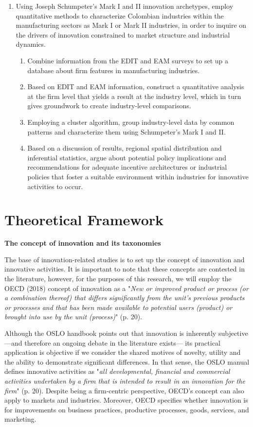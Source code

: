 \documentclass[12pt,a4paper]{article}
\begin{document}
\begin{enumerate}
	\item \large Using Joseph Schumpeter’s Mark I and II innovation archetypes, employ quantitative methods to characterize Colombian industries within the manufacturing sectors as Mark I or Mark II industries, in order to inquire on the drivers of innovation constrained to market structure and industrial dynamics.
\begin{enumerate}
	\item \normalsize Combine information from the EDIT and EAM surveys to set up a database about firm features in manufacturing industries.
	\item Based on EDIT and EAM information, construct a quantitative analysis at the firm level that yields a result at the industry level, which in turn gives groundwork to create industry-level comparisons.
	\item Employing a cluster algorithm, group industry-level data by common patterns and characterize them using Schumpeter's Mark I and II.
	\item Based on a discussion of results, regional spatial distribution and inferential statistics, argue about potential policy implications and recommendations for adequate incentive architectures or industrial policies that foster a suitable environment within industries for innovative activities to occur.
\end{enumerate}
\end{enumerate}

\pagebreak

\section{Theoretical Framework}

\textbf{The concept of innovation and its taxonomies }

The base of innovation-related studies is to set up the concept of innovation and innovative activities. It is important to note that these concepts are contested in the literature, however, for the purposes of this research, we will employ the OECD (2018) concept of innovation as a "\textit{New or improved product or process (or a combination thereof) that differs significantly from the unit's previous products or processes and that has been made available to potential users (product) or brought into use by the unit (process)}" (p. 20).  

Although the OSLO handbook points out that innovation is inherently subjective —and therefore an ongoing debate in the literature exists— its practical application is objective if we consider the shared motives of novelty, utility and the ability to demonstrate significant differences. In that sense, the OSLO manual defines innovative activities as "\textit{all developmental, financial and commercial activities undertaken by a firm that is intended to result in an innovation for the firm}" (p. 20). Despite being a firm-centric perspective, OECD's concept can also apply to markets and industries. Moreover, OECD specifies whether innovation is for improvements on business practices, productive processes, goods, services, and marketing.  
\end{document}
